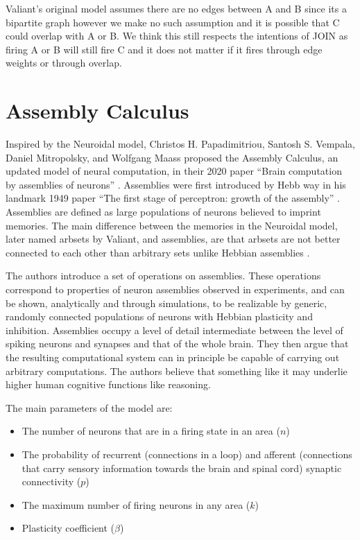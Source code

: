 Valiant's original model assumes there are no edges between A and B since its a bipartite graph however we make no such assumption and it is possible that C could overlap with A or B. We think this still respects the intentions of JOIN as firing A or B will still fire C and it does not matter if it fires through edge weights or through overlap. 

\section{Assembly Calculus}

Inspired by the Neuroidal model, Christos H. Papadimitriou, Santosh S. Vempala, Daniel Mitropolsky, and Wolfgang Maass proposed the Assembly Calculus, an updated model of neural computation, in their 2020 paper ``Brain computation by assemblies of neurons'' \cite{papadimitriou2020brain}. Assemblies were first introduced by Hebb way in his landmark 1949 paper ``The first stage of perceptron: growth of the assembly'' \cite{hebb1949first}. Assemblies are defined as large populations of neurons believed to imprint memories. The main difference between the memories in the Neuroidal model, later named arbsets by Valiant, and assemblies, are that arbsets are not better connected to each other than arbitrary sets unlike Hebbian assemblies \cite{valiant2017capacity}.

The authors introduce a set of operations on assemblies. These operations correspond to properties of neuron assemblies observed in experiments, and can be shown, analytically and through simulations, to be realizable by generic, randomly connected populations of neurons with Hebbian plasticity and inhibition. Assemblies occupy a level of detail intermediate between the level of spiking neurons and synapses and that of the whole brain. They then argue that the resulting computational system can in principle be capable of carrying out arbitrary computations. The authors believe that something like it may underlie higher human cognitive functions like reasoning. 

The main parameters of the model are:
\begin{itemize}
    \item The number of neurons that are in a firing state in an area ($n$) 
    \item The probability of recurrent (connections in a loop) and afferent (connections that carry sensory information towards the brain and spinal cord) synaptic connectivity ($p$)
    \item The maximum number of firing neurons in any area ($k$)
    \item Plasticity coefficient ($\beta$)
\end{itemize}

